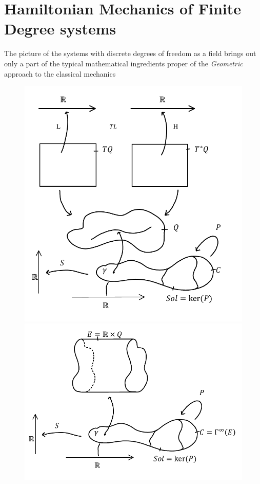 \documentclass[Main]{subfiles}
\begin{document}
	\section{Hamiltonian Mechanics of Finite Degree systems}
		The picture of the systems with discrete degrees of freedom as a field brings out only a part of the typical mathematical ingredients proper of the \emph{Geometric} approach to the classical mechanics

		\begin{figure}[h!]
		\centering
		\begin{minipage}{0.45\textwidth}
			\centering
			\includegraphics[width=\textwidth]{Pictures/GeoMecFrame} 
		\end{minipage}\hfill
		\begin{minipage}{0.45\textwidth}
			\centering
			\includegraphics[width=\textwidth]{Pictures/FieMecFrame} 

\end{minipage}
\end{figure}
\end{document}
